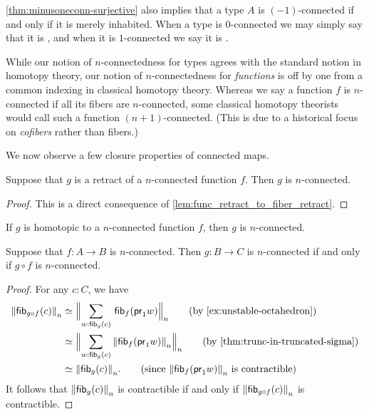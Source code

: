 \cref{thm:minusoneconn-surjective} also implies that a type $A$ is $(-1)$-connected if and only if it is merely inhabited.
When a type is $0$-connected we may simply say that it is ,
%
%
and when it is $1$-connected we say it is .
%
%

\begin{rmk}\label{rmk:connectedness-indexing}
  While our notion of $n$-connectedness for types agrees with the standard notion in homotopy theory, our notion of $n$-connectedness for \emph{functions} is off by one from a common indexing in classical homotopy theory.
  Whereas we say a function $f$ is $n$-connected if all its fibers are $n$-connected, some classical homotopy theorists would call such a function $(n+1)$-connected.
  (This is due to a historical focus on \emph{cofibers} rather than fibers.)
\end{rmk}

We now observe a few closure properties of connected maps.

\begin{lem}
%
Suppose that $g$ is a retract of a $n$-connected function $f$.  Then $g$ is
$n$-connected.
\end{lem}
\begin{proof}
This is a direct consequence of \cref{lem:func_retract_to_fiber_retract}.
\end{proof}

\begin{cor}
If $g$ is homotopic to a $n$-connected function $f$, then $g$ is $n$-connected.
\end{cor}

\begin{lem}\label{lem:nconnected_postcomp}
Suppose that $f:A\to B$ is $n$-connected. Then $g:B\to C$ is $n$-connected if and only if $g\circ f$ is
$n$-connected.
\end{lem}

\begin{proof}
For any $c:C$, we have
\begin{align*}
  \trunc n{\hfib{g\circ f}c}
  & \eqvsym \Trunc n{ \sm{w:\hfib{g}c}\hfib{f}{\proj1 w}}
  \tag{by \cref{ex:unstable-octahedron}}\\
  & \eqvsym \Trunc n{\sm{w:\hfib{g}c} \trunc n{\hfib{f}{\proj1 w}}}
  \tag{by \cref{thm:trunc-in-truncated-sigma}}\\
  & \eqvsym \trunc n{\hfib{g}c}.
  \tag{since $\trunc n{\hfib{f}{\proj1 w}}$ is contractible}
\end{align*}
It follows that $\trunc n{\hfib{g}c}$ is contractible if and only if $\trunc n{\hfib{g\circ f}c}$ is
contractible.
\end{proof}

